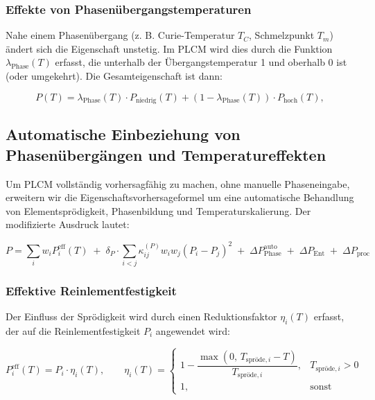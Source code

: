 \documentclass[12pt,a4paper]{article}
\begin{document}
\subsubsection{Effekte von Phasenübergangstemperaturen}

Nahe einem Phasenübergang (z. B. Curie-Temperatur \(T_C\), Schmelzpunkt \(T_m\)) ändert sich die Eigenschaft unstetig. Im PLCM wird dies durch die Funktion \(\lambda_{\text{Phase}}(T)\) erfasst, die unterhalb der Übergangstemperatur 1 und oberhalb 0 ist (oder umgekehrt). Die Gesamteigenschaft ist dann:

\begin{equation}
	P(T) = \lambda_{\text{Phase}}(T) \cdot P_{\text{niedrig}}(T) + (1-\lambda_{\text{Phase}}(T)) \cdot P_{\text{hoch}}(T),
	\label{eq:phase-transition}
\end{equation}

\subsection{Automatische Einbeziehung von Phasenübergängen und Temperatureffekten}
\label{subsec:auto-phase}

Um PLCM vollständig vorhersagfähig zu machen, ohne manuelle Phaseneingabe, erweitern wir die Eigenschaftsvorhersageformel um eine automatische Behandlung von Elementsprödigkeit, Phasenbildung und Temperaturskalierung. Der modifizierte Ausdruck lautet:

\begin{equation}
	\boxed{
		P = \sum_i w_i P_i^{\text{eff}}(T) \;+\; \delta_P \cdot \sum_{i<j} \kappa_{ij}^{(P)} w_i w_j (P_i - P_j)^2 \;+\; \Delta P_{\text{Phase}}^{\text{auto}} \;+\; \Delta P_{\text{Ent}} \;+\; \Delta P_{\text{proc}}
	}
	\label{eq:plcm-auto}
\end{equation}

\subsubsection{Effektive Reinlementfestigkeit}
Der Einfluss der Sprödigkeit wird durch einen Reduktionsfaktor $\eta_i(T)$ erfasst, der auf die Reinlementfestigkeit $P_i$ angewendet wird:

\begin{equation}
	P_i^{\text{eff}}(T) = P_i \cdot \eta_i(T), \qquad
	\eta_i(T) = 
	\begin{cases}
		1 - \dfrac{\max(0,\, T_{\text{spröde},i} - T)}{T_{\text{spröde},i}}, & T_{\text{spröde},i} > 0 \\
		1, & \text{sonst}
	\end{cases}
\end{equation}
\end{document}
